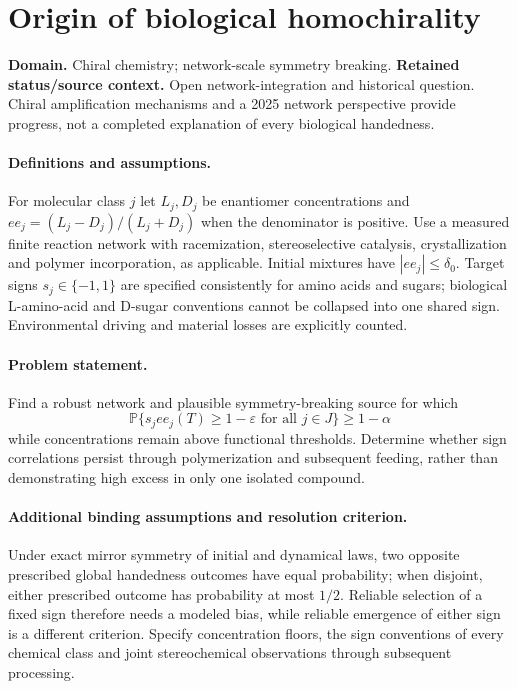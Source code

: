\documentclass[11pt]{article}
\begin{document}
\section*{Origin of biological homochirality}
\label{prob:289}
\label{rank:191}
\par\smallskip

\noindent\textbf{Domain.} Chiral chemistry; network-scale symmetry breaking. \quad \textbf{Retained status/source context.} Open network-integration and historical question. Chiral amplification mechanisms and a 2025 network perspective provide progress, not a completed explanation of every biological handedness.

\paragraph{Definitions and assumptions.} For molecular class $j$ let $L_j,D_j$ be enantiomer concentrations and $ee_j=(L_j-D_j)/(L_j+D_j)$ when the denominator is positive. Use a measured finite reaction network with racemization, stereoselective catalysis, crystallization and polymer incorporation, as applicable. Initial mixtures have $|ee_j|\leq\delta_0$. Target signs $s_j\in\{-1,1\}$ are specified consistently for amino acids and sugars; biological L-amino-acid and D-sugar conventions cannot be collapsed into one shared sign. Environmental driving and material losses are explicitly counted.

\paragraph{Problem statement.} Find a robust network and plausible symmetry-breaking source for which
\[
\mathbb{P}\{s_jee_j(T)\geq1-\varepsilon\text{ for all }j\in J\}\geq1-\alpha
\]
while concentrations remain above functional thresholds. Determine whether sign correlations persist through polymerization and subsequent feeding, rather than demonstrating high excess in only one isolated compound.

\paragraph{Additional binding assumptions and resolution criterion.} Under exact mirror symmetry of initial and dynamical laws, two opposite prescribed global handedness outcomes have equal probability; when disjoint, either prescribed outcome has probability at most $1/2$. Reliable selection of a fixed sign therefore needs a modeled bias, while reliable emergence of either sign is a different criterion. Specify concentration floors, the sign conventions of every chemical class and joint stereochemical observations through subsequent processing.
\end{document}
